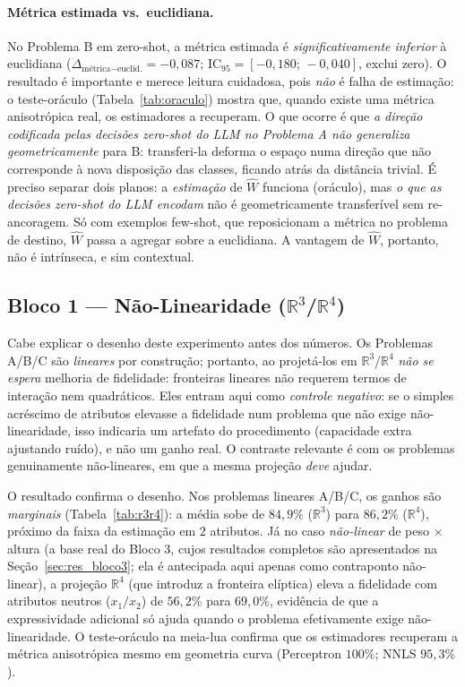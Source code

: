 \documentclass[12pt,a4paper]{article}
\newcommand{\West}{\ensuremath{\hat{W}}}   %
\begin{document}
\paragraph{Métrica estimada vs.\ euclidiana.}
No Problema B em zero-shot, a métrica estimada é \emph{significativamente inferior} à
euclidiana ($\Delta_{\text{métrica}-\text{euclid.}} = -0{,}087$;
IC$_{95} = [-0{,}180;\,-0{,}040]$, exclui zero). O resultado é importante e merece leitura
cuidadosa, pois \emph{não} é falha de estimação: o teste-oráculo
(Tabela~\ref{tab:oraculo}) mostra que, quando existe uma métrica anisotrópica real, os
estimadores a recuperam. O que ocorre é que \emph{a direção codificada pelas decisões
zero-shot do LLM no Problema A não generaliza geometricamente} para B: transferi-la deforma
o espaço numa direção que não corresponde à nova disposição das classes, ficando atrás da
distância trivial. É preciso separar dois planos: a \emph{estimação} de \West{} funciona
(oráculo), mas \emph{o que as decisões zero-shot do LLM encodam} não é geometricamente
transferível sem re-ancoragem. Só com exemplos few-shot, que reposicionam a métrica no
problema de destino, \West{} passa a agregar sobre a euclidiana. A vantagem de \West{}, portanto,
não é intrínseca, e sim contextual.

\FloatBarrier

\subsection{Bloco 1 — Não-Linearidade (\texorpdfstring{$\mathbb{R}^3$/$\mathbb{R}^4$}{R3/R4})}

Cabe explicar o desenho deste experimento antes dos números. Os Problemas A/B/C são
\emph{lineares} por construção; portanto, ao projetá-los em $\mathbb{R}^3$/$\mathbb{R}^4$
\emph{não se espera} melhoria de fidelidade: fronteiras lineares não requerem termos de
interação nem quadráticos. Eles entram aqui como \emph{controle negativo}: se o simples
acréscimo de atributos elevasse a fidelidade num problema que não exige não-linearidade,
isso indicaria um artefato do procedimento (capacidade extra ajustando ruído), e não um
ganho real. O contraste relevante é com os problemas genuinamente não-lineares, em que a
mesma projeção \emph{deve} ajudar.

O resultado confirma o desenho. Nos problemas lineares A/B/C, os ganhos são
\emph{marginais} (Tabela~\ref{tab:r3r4}): a média sobe de $84{,}9\%$
($\mathbb{R}^3$)
para $86{,}2\%$ ($\mathbb{R}^4$), próximo da faixa da estimação em $2$ atributos. Já no
caso
\emph{não-linear} de peso $\times$ altura (a base real do Bloco 3, cujos resultados
completos são apresentados na Seção~\ref{sec:res_bloco3}; ela é antecipada aqui apenas
como contraponto não-linear), a projeção $\mathbb{R}^4$ (que
introduz a
fronteira elíptica) eleva a fidelidade com atributos neutros ($x_1/x_2$) de
$56{,}2\%$ para $69{,}0\%$, evidência de que a expressividade adicional só ajuda quando o
problema efetivamente exige não-linearidade. O teste-oráculo na meia-lua confirma que os
estimadores recuperam a métrica anisotrópica mesmo em geometria curva (Perceptron $100\%$;
NNLS $95{,}3\%$).
\end{document}
